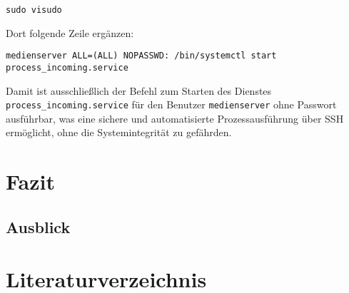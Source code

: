 \documentclass[12pt,a4paper]{report}
\begin{document}
    \begin{verbatim}
sudo visudo
    \end{verbatim}

    Dort folgende Zeile ergänzen:

    \begin{verbatim}
medienserver ALL=(ALL) NOPASSWD: /bin/systemctl start process_incoming.service
    \end{verbatim}

    Damit ist ausschließlich der Befehl zum Starten des Dienstes \texttt{process\_incoming.service} 
    für den Benutzer \texttt{medienserver} ohne Passwort ausführbar, 
    was eine sichere und automatisierte Prozessausführung über SSH ermöglicht, 
    ohne die Systemintegrität zu gefährden.
   
\chapter*{Fazit}
\setcounter{section}{0}

\section{Ausblick}


\cleardoublepage
\chapter*{Literaturverzeichnis}
\printbibliography[heading=none]
\end{document}
